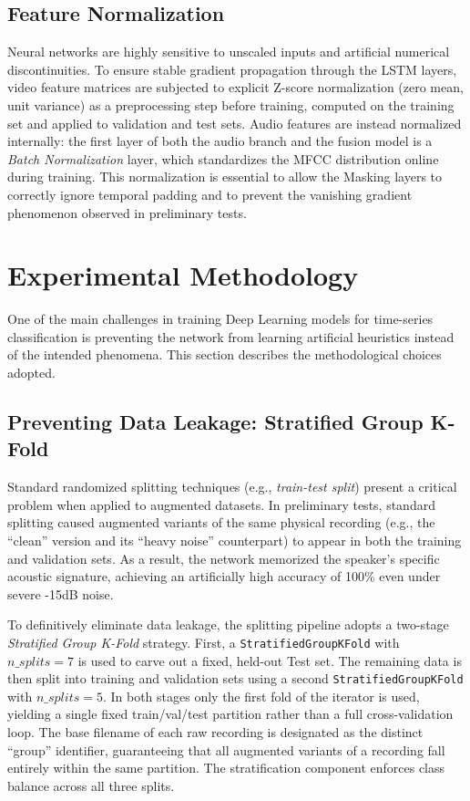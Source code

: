 \documentclass[sigconf,screen,nonacm]{acmart}
\begin{document}
\subsection{Feature Normalization}
Neural networks are highly sensitive to unscaled inputs and artificial numerical discontinuities. To ensure stable gradient propagation through the LSTM layers, video feature matrices are subjected to explicit Z-score normalization (zero mean, unit variance) as a preprocessing step before training, computed on the training set and applied to validation and test sets. Audio features are instead normalized internally: the first layer of both the audio branch and the fusion model is a \textit{Batch Normalization} layer, which standardizes the MFCC distribution online during training. This normalization is essential to allow the Masking layers to correctly ignore temporal padding and to prevent the vanishing gradient phenomenon observed in preliminary tests.

\section{Experimental Methodology}

One of the main challenges in training Deep Learning models for time-series classification is preventing the network from learning artificial heuristics instead of the intended phenomena. This section describes the methodological choices adopted.

\subsection{Preventing Data Leakage: Stratified Group K-Fold}
\label{sec:splitting}
Standard randomized splitting techniques (e.g., \textit{train-test split}) present a critical problem when applied to augmented datasets. In preliminary tests, standard splitting caused augmented variants of the same physical recording (e.g., the ``clean'' version and its ``heavy noise'' counterpart) to appear in both the training and validation sets. As a result, the network memorized the speaker's specific acoustic signature, achieving an artificially high accuracy of 100\% even under severe -15dB noise.

\begin{sloppypar}
  To definitively eliminate data leakage, the splitting pipeline adopts a two-stage
  \textit{Stratified Group K-Fold} strategy. First, a \texttt{Stratified}\allowbreak\texttt{GroupKFold}
  with $n\_splits=7$ is used to carve out a fixed, held-out Test set. The remaining
  data is then split into training and validation sets using a second
  \texttt{Stratified}\allowbreak\texttt{GroupKFold} with $n\_splits=5$. In both stages only the first
  fold of the iterator is used, yielding a single fixed train/val/test partition
  rather than a full cross-validation loop. The base filename of each raw recording
  is designated as the distinct ``group'' identifier, guaranteeing that all augmented
  variants of a recording fall entirely within the same partition. The stratification
  component enforces class balance across all three splits.
\end{sloppypar}
\end{document}
